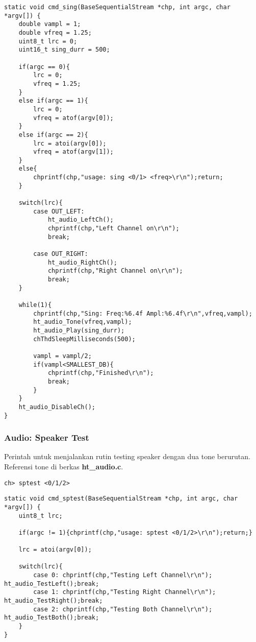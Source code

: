 \documentclass[12pt,]{article}
\begin{document}
	\begin{verbatim}
static void cmd_sing(BaseSequentialStream *chp, int argc, char *argv[]) {
	double vampl = 1;
	double vfreq = 1.25;
	uint8_t lrc = 0;
	uint16_t sing_durr = 500;
	
	if(argc == 0){
		lrc = 0;
		vfreq = 1.25;
	}
	else if(argc == 1){
		lrc = 0;
		vfreq = atof(argv[0]);
	}
	else if(argc == 2){
		lrc = atoi(argv[0]);
		vfreq = atof(argv[1]);
	}
	else{
		chprintf(chp,"usage: sing <0/1> <freq>\r\n");return;
	}
	
	switch(lrc){
		case OUT_LEFT:
			ht_audio_LeftCh();
			chprintf(chp,"Left Channel on\r\n");
			break;
			
		case OUT_RIGHT:
			ht_audio_RightCh();
			chprintf(chp,"Right Channel on\r\n");
			break;
	}
	
	while(1){
		chprintf(chp,"Sing: Freq:%6.4f Ampl:%6.4f\r\n",vfreq,vampl);
		ht_audio_Tone(vfreq,vampl);
		ht_audio_Play(sing_durr);
		chThdSleepMilliseconds(500);
		
		vampl = vampl/2;
		if(vampl<SMALLEST_DB){
			chprintf(chp,"Finished\r\n");
			break;
		}
	}
	ht_audio_DisableCh();
}
	\end{verbatim}
	
	\newpage
	\subsubsection{Audio: Speaker Test}
	Perintah untuk menjalankan rutin testing speaker dengan dua tone berurutan.
	Referensi tone di berkas \textbf{ht\_audio.c}.
	\begin{verbatim}
ch> sptest <0/1/2>
	\end{verbatim}
	
	\begin{verbatim}
static void cmd_sptest(BaseSequentialStream *chp, int argc, char *argv[]) {
	uint8_t lrc;
	
	if(argc != 1){chprintf(chp,"usage: sptest <0/1/2>\r\n");return;}
	
	lrc = atoi(argv[0]);
	
	switch(lrc){
		case 0: chprintf(chp,"Testing Left Channel\r\n"); ht_audio_TestLeft();break;
		case 1: chprintf(chp,"Testing Right Channel\r\n"); ht_audio_TestRight();break;
		case 2: chprintf(chp,"Testing Both Channel\r\n"); ht_audio_TestBoth();break;
	}
}
	\end{verbatim}
	
\end{document}

